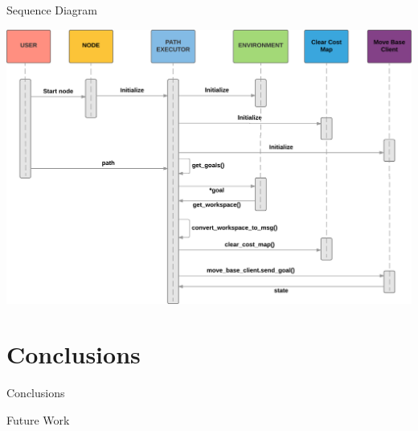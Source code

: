 \documentclass[12pt,aspectratio=43,xcolor={usenames,dvipsnames,table}]{beamer}
\begin{document}
\begin{frame}{Sequence Diagram}
    \begin{center}
        \includegraphics[width=\linewidth,height=0.9\textheight,keepaspectratio]{gfx/02.pdf}
    \end{center}
\end{frame}

\section{Conclusions}
\begin{frame}{Conclusions}
\end{frame}
\begin{frame}{Future Work}
\end{frame}
\end{document}
